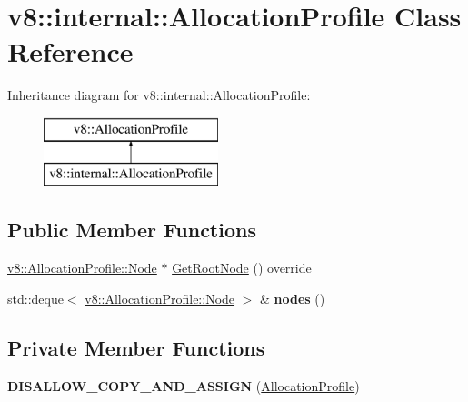 \hypertarget{classv8_1_1internal_1_1_allocation_profile}{}\section{v8\+:\+:internal\+:\+:Allocation\+Profile Class Reference}
\label{classv8_1_1internal_1_1_allocation_profile}
Inheritance diagram for v8\+:\+:internal\+:\+:Allocation\+Profile\+:\begin{figure}[H]
\begin{center}
\leavevmode
\includegraphics[height=2.000000cm]{classv8_1_1internal_1_1_allocation_profile}
\end{center}
\end{figure}
\subsection*{Public Member Functions}
\begin{DoxyCompactItemize}
\item 
\hyperlink{structv8_1_1_allocation_profile_1_1_node}{v8\+::\+Allocation\+Profile\+::\+Node} $\ast$ \hyperlink{classv8_1_1internal_1_1_allocation_profile_abb93406eaccd8b37de3e080d0620bc2b}{Get\+Root\+Node} () override
\item 
std\+::deque$<$ \hyperlink{structv8_1_1_allocation_profile_1_1_node}{v8\+::\+Allocation\+Profile\+::\+Node} $>$ \& {\bfseries nodes} ()\hypertarget{classv8_1_1internal_1_1_allocation_profile_aae4669a89f83fbb4cb0d6bcf334d617b}{}\label{classv8_1_1internal_1_1_allocation_profile_aae4669a89f83fbb4cb0d6bcf334d617b}

\end{DoxyCompactItemize}
\subsection*{Private Member Functions}
\begin{DoxyCompactItemize}
\item 
{\bfseries D\+I\+S\+A\+L\+L\+O\+W\+\_\+\+C\+O\+P\+Y\+\_\+\+A\+N\+D\+\_\+\+A\+S\+S\+I\+GN} (\hyperlink{classv8_1_1internal_1_1_allocation_profile}{Allocation\+Profile})\hypertarget{classv8_1_1internal_1_1_allocation_profile_a6d8a3ded6b83bf1a664d05b7940070df}{}\label{classv8_1_1internal_1_1_allocation_profile_a6d8a3ded6b83bf1a664d05b7940070df}

\end{DoxyCompactItemize}
